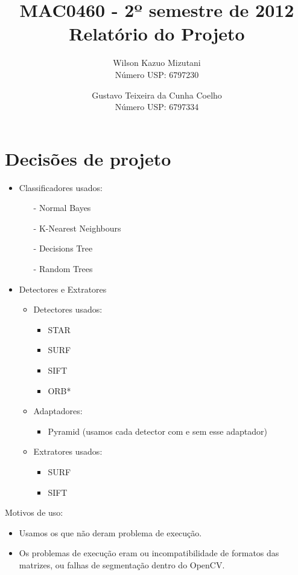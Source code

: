 \documentclass[a4paper,11pt]{article}
\title{MAC0460 - 2º semestre de 2012 \\ Relatório do Projeto}
\author{
  Wilson Kazuo Mizutani\\
  Número USP: 6797230
  \and
  Gustavo Teixeira da Cunha Coelho\\
  Número USP: 6797334
}
\begin{document}
\maketitle

\section{Decisões de projeto}

\begin{itemize}
  \item Classificadores usados:
  \begin{itemize}
    \item[-] Normal Bayes
    \item[-] K-Nearest Neighbours
    \item[-] Decisions Tree
    \item[-] Random Trees
  \end{itemize}
  
  \item Detectores e Extratores
    \begin{itemize}
      \item Detectores usados:
        \begin{itemize}
          \item STAR
          \item SURF
          \item SIFT
          \item ORB*
        \end{itemize}

      \item Adaptadores:
        \begin{itemize} 
          \item Pyramid (usamos cada detector com e sem esse adaptador)
        \end{itemize}

      \item Extratores usados:
        \begin{itemize} 
          \item SURF
          \item SIFT
        \end{itemize}

    \end{itemize}

\end{itemize}

Motivos de uso:
\begin{itemize}
  \item Usamos os que não deram problema de execução.
  \item Os problemas de execução eram ou incompatibilidade de formatos das matrizes, ou falhas de segmentação dentro do OpenCV.
\end{itemize}
\end{document}
